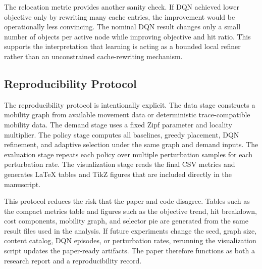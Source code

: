The relocation metric provides another sanity check. If DQN achieved lower objective only by rewriting many cache entries, the improvement would be operationally less convincing. The nominal DQN result changes only a small number of objects per active node while improving objective and hit ratio. This supports the interpretation that learning is acting as a bounded local refiner rather than an unconstrained cache-rewriting mechanism.

\subsection{Reproducibility Protocol}

The reproducibility protocol is intentionally explicit. The data stage constructs a mobility graph from available movement data or deterministic trace-compatible mobility data. The demand stage uses a fixed Zipf parameter and locality multiplier. The policy stage computes all baselines, greedy placement, DQN refinement, and adaptive selection under the same graph and demand inputs. The evaluation stage repeats each policy over multiple perturbation samples for each perturbation rate. The visualization stage reads the final CSV metrics and generates LaTeX tables and TikZ figures that are included directly in the manuscript.

This protocol reduces the risk that the paper and code disagree. Tables such as the compact metrics table and figures such as the objective trend, hit breakdown, cost components, mobility graph, and selector pie are generated from the same result files used in the analysis. If future experiments change the seed, graph size, content catalog, DQN episodes, or perturbation rates, rerunning the visualization script updates the paper-ready artifacts. The paper therefore functions as both a research report and a reproducibility record.
